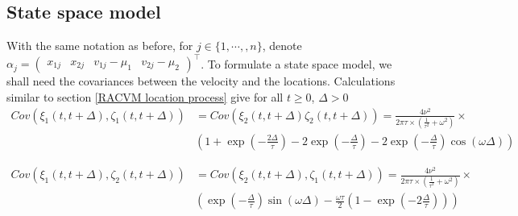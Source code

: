 \documentclass[11pt]{article}
\newcommand {\1}{\mathbb{1}}
\begin{document}
\subsection{State space model}
With the same notation as before, for $j \in \{1,\cdots,,n\}$, denote $\alpha_j=\begin{pmatrix} x_{1j} & x_{2j} & v_{1j}-\mu_1 & v_{2j}-\mu_2 \end{pmatrix}^\top$.
To formulate a state space model, we shall need the covariances between the velocity and the locations.
Calculations similar to  section \ref{RACVM location process} give for all $t \geq 0$, $\Delta >0$
\begin{align*}
	Cov(\xi_1(t,t+\Delta),\zeta_1(t,t+\Delta))&=Cov(\xi_2(t,t+\Delta)\zeta_2(t,t+\Delta))=\frac{4\nu^2}{2 \pi \tau \times \left( \frac{1}{\tau^2}+\omega^2\right)} \times \\
	& \left( 1+\exp\left( -\frac{2\Delta}{\tau}\right)-2\exp\left( -\frac{\Delta}{\tau}\right)-2\exp\left( -\frac{\Delta}{\tau}\right) \cos(\omega \Delta)\right)
\end{align*}

\begin{align*}
	Cov(\xi_1(t,t+\Delta),\zeta_2(t,t+\Delta))&=Cov(\xi_2(t,t+\Delta),\zeta_1(t,t+\Delta))=\frac{4\nu^2}{2 \pi \tau \times \left( \frac{1}{\tau^2}+\omega^2\right)} \times \\
	&\left( \exp\left( -\frac{\Delta}{\tau}\right) \sin(\omega \Delta)-\frac{\omega \tau}{2} \left(1-\exp\left( -2 \frac{\Delta}{\tau}\right) \right)\right)
\end{align*}
\end{document}
